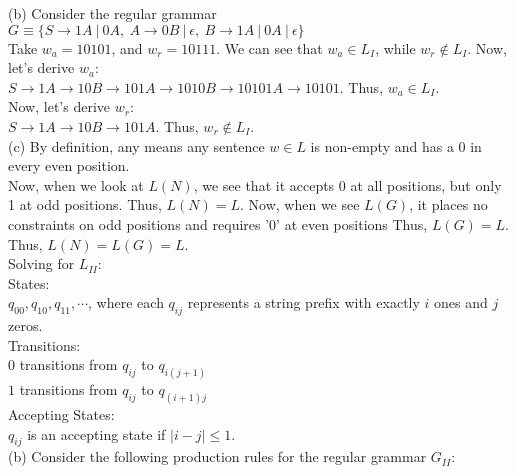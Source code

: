 \documentclass[a4paper]{article}
\begin{document}
\begin{enumerate}

(b) Consider the regular grammar $G \equiv \{S\rightarrow 1A \ |\ 0A,\ A\rightarrow 0B\ |\ \epsilon,\ B\rightarrow 1A \ |\ 0A\ |\ \epsilon \}$\\

Take $w_a = 10101$, and $w_r = 10111$. We can see that $w_a \in L_I$, while $w_r \notin L_I$. Now, let's derive $w_a$:\\

$S \rightarrow 1A \rightarrow 10B \rightarrow 101A \rightarrow 1010B \rightarrow 10101A \rightarrow 10101$. Thus, $w_a \in L_I$.\\

Now, let's derive $w_r$:\\

$S \rightarrow 1A \rightarrow 10B \rightarrow 101A$. Thus, $w_r \notin L_I$.\\

(c) By definition, any means any sentence $w \in L$ is non-empty and has a 0 in every even position.\\

Now, when we look at $L(N)$, we see that it accepts 0 at all positions, but only 1 at odd positions. Thus, $L(N) = L$. Now, when we see $L(G)$, it places no constraints on odd positions and requires '0' at even positions Thus, $L(G) = L$. Thus, $L(N) = L(G) = L$.\\

Solving for $L_{II}$:\\

States:\\
$q_{00}, q_{10}, q_{11}, \cdots$, where each $q_{ij}$ represents a string prefix with exactly $i$ ones and $j$ zeros.\\

Transitions:\\
$0$ transitions from $q_{ij}$ to $q_{i(j+1)}$\\
$1$ transitions from $q_{ij}$ to $q_{(i+1)j}$\\

Accepting States:\\
$q_{ij}$ is an accepting state if $|i - j| \leq 1$.\\

(b) Consider the following production rules for the regular grammar $G_{II}$:\\


\end{enumerate}
\end{document}
